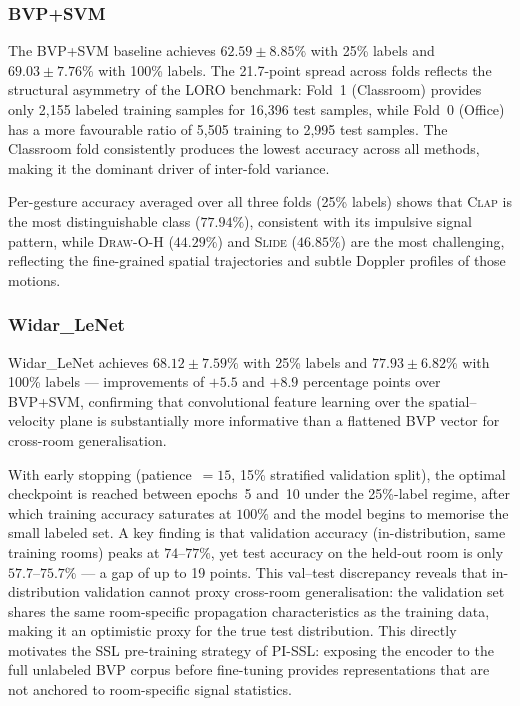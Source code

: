\documentclass[journal]{IEEEtran}
\begin{document}
\subsubsection*{BVP+SVM}
The BVP+SVM baseline achieves $62.59 \pm 8.85\%$ with 25\% labels
and $69.03 \pm 7.76\%$ with 100\% labels.
The 21.7-point spread across folds reflects the structural asymmetry
of the LORO benchmark: Fold~1 (Classroom) provides only 2{,}155
labeled training samples for 16{,}396 test samples, while Fold~0
(Office) has a more favourable ratio of 5{,}505 training to 2{,}995
test samples.
The Classroom fold consistently produces the lowest accuracy across
all methods, making it the dominant driver of inter-fold variance.

Per-gesture accuracy averaged over all three folds (25\% labels)
shows that \textsc{Clap} is the most distinguishable class
($77.94\%$), consistent with its impulsive signal pattern, while
\textsc{Draw-O-H} ($44.29\%$) and \textsc{Slide} ($46.85\%$) are
the most challenging, reflecting the fine-grained spatial
trajectories and subtle Doppler profiles of those motions.

\subsubsection*{Widar\_LeNet}
Widar\_LeNet achieves $68.12 \pm 7.59\%$ with 25\% labels and
$77.93 \pm 6.82\%$ with 100\% labels --- improvements of $+5.5$
and $+8.9$ percentage points over BVP+SVM, confirming that
convolutional feature learning over the spatial--velocity plane is
substantially more informative than a flattened BVP vector for
cross-room generalisation.

With early stopping (patience~$=15$, 15\% stratified validation
split), the optimal checkpoint is reached between epochs~5 and~10
under the 25\%-label regime, after which training accuracy saturates
at $100\%$ and the model begins to memorise the small labeled set.
A key finding is that validation accuracy (in-distribution, same
training rooms) peaks at $74$--$77\%$, yet test accuracy on the
held-out room is only $57.7$--$75.7\%$ --- a gap of up to 19 points.
This val--test discrepancy reveals that in-distribution validation
cannot proxy cross-room generalisation: the validation set shares the
same room-specific propagation characteristics as the training data,
making it an optimistic proxy for the true test distribution.
This directly motivates the SSL pre-training strategy of PI-SSL:
exposing the encoder to the full unlabeled BVP corpus before
fine-tuning provides representations that are not anchored to
room-specific signal statistics.
\end{document}
